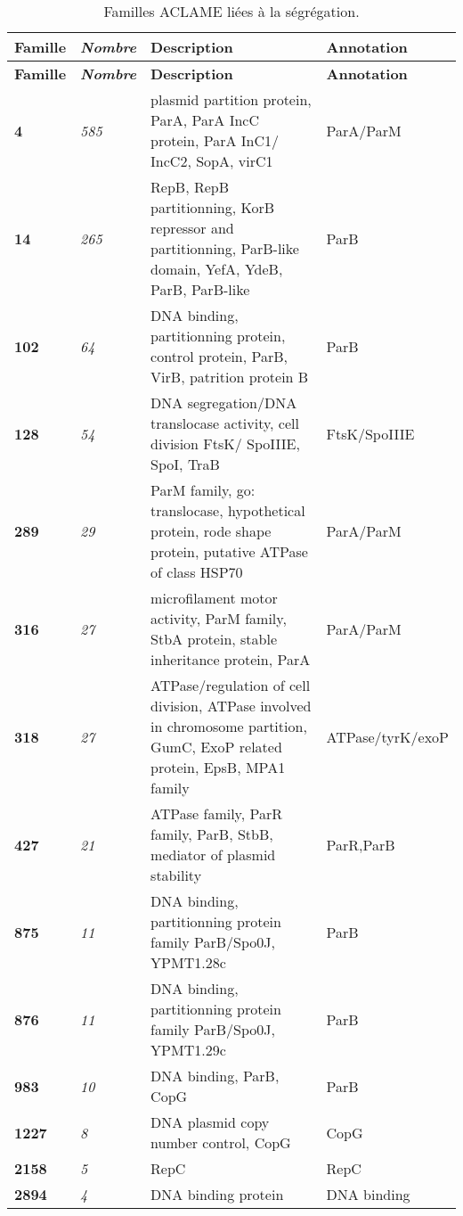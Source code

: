 \begin{longtable}{ >{\bfseries\small}p{}| >{\itshape\small}p{} >{\small}p{} | >{\small}p{}}
 \caption{Familles ACLAME liées à la ségrégation.}\\
{\normalsize\bf Famille} & {\normalsize\bf Nombre} & {\normalsize\bf Description} & {\normalsize\bf Annotation}\\
\endfirsthead
{\normalsize\bf Famille} & {\normalsize\bf Nombre} & {\normalsize\bf Description} & {\normalsize\bf Annotation}\\
\endhead
4 & 585 & plasmid partition protein, ParA, ParA IncC protein, ParA InC1/ IncC2, SopA, virC1 & ParA/ParM\\
14 & 265 & RepB, RepB partitionning, KorB repressor and partitionning, ParB-like domain, YefA, YdeB, ParB, ParB-like & ParB\\
102 & 64 & DNA binding, partitionning protein, control protein, ParB, VirB, patrition protein B & ParB\\
128 & 54 & DNA segregation/DNA translocase activity, cell division FtsK/ SpoIIIE, SpoI, TraB & FtsK/SpoIIIE\\
289 & 29 & ParM family, go: translocase, hypothetical protein, rode shape protein, putative ATPase of class HSP70 & ParA/ParM\\
316 & 27 & microfilament motor activity, ParM family, StbA protein, stable inheritance protein, ParA & ParA/ParM\\
318 & 27 & ATPase/regulation of cell division, ATPase involved in chromosome partition, GumC, ExoP related protein, EpsB, MPA1 family & ATPase/tyrK/exoP\\
427 & 21 & ATPase family, ParR family, ParB, StbB, mediator of plasmid stability & ParR,ParB\\
875 & 11 & DNA binding, partitionning protein family ParB/Spo0J, YPMT1.28c & ParB\\
876 & 11 & DNA binding, partitionning protein family ParB/Spo0J, YPMT1.29c & ParB\\
983 & 10 & DNA binding, ParB, CopG & ParB\\
1227 & 8 & DNA plasmid copy number control, CopG & CopG\\
2158 & 5 & RepC & RepC\\
2894 & 4 & DNA binding protein & DNA binding\\
\end{longtable}

